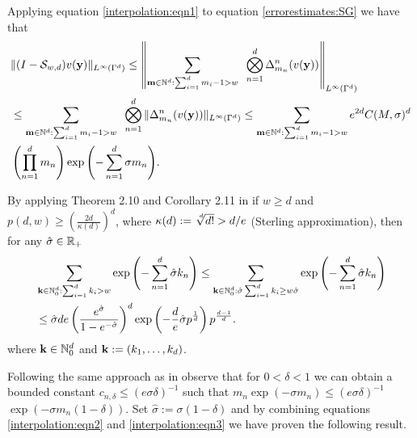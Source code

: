 \documentclass[11pt,final]{amsart}       %
\begin{document}
Applying equation \eqref{interpolation:eqn1} to equation
\eqref{errorestimates:SG} we have that
\begin{equation}
\begin{split}
& \| (I - \mathcal{S}_{w,d})
 v(\mathbf{y})
 \|_{L^{\infty}(\Gamma^{d})}
 \leq
 \left\| \sum_{\mathbf{m} \in {\mathbb N}^{d}: \sum_{i=1}^{d} m_i - 1 > w } \;\;
 \bigotimes_{n=1}^{d} {\Delta^{n}_{m_n}}(v(\mathbf{y}))\right\|_{L^{\infty}(\Gamma^d)} \\
 &\leq
 \sum_{\mathbf{m} \in {\mathbb N}^{d}: \sum_{i=1}^{d} m_i - 1 > w } \;\;
 \bigotimes_{n=1}^{d} \|{\Delta^{n}_{m_n}}(v(\mathbf{y}))\|_{L^{\infty}(\Gamma^d)} 
 \leq
 \sum_{\mathbf{m} \in {\mathbb N}^{d}: \sum_{i=1}^{d} m_i - 1 > w }
 e^{2d} C(M,\sigma)^{d} \\
 &
 \left( \prod_{n=1}^{d} m_n\right) \exp{\left( -\sum_{n=1}^{d}
   \sigma m_{n} \right)}.
\end{split}
\label{interpolation:eqn2}
\end{equation}

By applying Theorem 2.10 and Corollary 2.11 in \cite{Griebel2016} if
$ w \geq  d$ and $p( d, w) \geq
\left(\frac{2  d}{\kappa( d)}\right)^{ d}$, where
$\kappa( d) := \sqrt[\leftroot{-2}\uproot{2}  d]{
  d!} >  d/e$ (Sterling approximation), then for any $\hat
\sigma \in \Bbb{R}_{+}$
\begin{equation}
\begin{split}
 & \sum_{\mathbf{k} \in {\mathbb N}^{ d}_{0}: \sum_{i=1}^{ d} k_i  >  w }
 \exp{\left( -\sum_{n=1}^{ d} \hat \sigma
   k_{n} \right)}
 \leq
 \sum_{\mathbf{k} \in {\mathbb N}^{d}_{0}: \hat \sigma \sum_{i=1}^{ d} k_i  \geq  w \hat \sigma  }
 \exp{\left( -\sum_{n=1}^{ d}
   \hat \sigma k_{n} \right)} \\
 &\leq
 \hat \sigma  d e
 \left( \frac{e^{\hat \sigma}}{1 - e^{-\hat \sigma}} \right)^{ d}
 \exp \left(-\frac{ d}{e} \hat \sigma  p^{\frac{1}{ d}}
 \right) p^{\frac{ d-1}{ d}}.
\end{split}
\label{interpolation:eqn3}
\end{equation}
where $\mathbf{k} \in {\mathbb N}^{d}_{0}$ and $\mathbf{k}:=(k_1,\dots,k_d)$.






Following the same approach as in \cite{Griebel2016} observe that for
$0 < \delta < 1$ we can obtain a bounded constant $c_{n,\delta} \leq
(e\sigma \delta)^{-1}$ such that $m_n \exp(-\sigma m_n) \leq (e\sigma
\delta)^{-1}$ $\exp(-\sigma m_n (1 - \delta))$. Set $\hat \sigma :=
\sigma (1 - \delta)$ and by combining equations
\eqref{interpolation:eqn2} and \eqref{interpolation:eqn3} we have
proven the following result.
\end{document}
